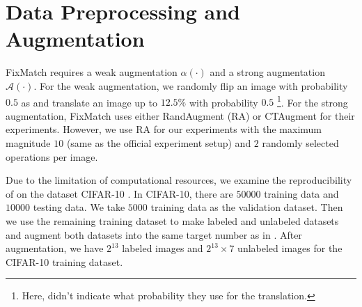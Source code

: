 \section{Data Preprocessing and Augmentation} \label{sec:data}
FixMatch requires a weak augmentation $\alpha(\cdot)$ and a strong augmentation $\mathcal{A}(\cdot)$.
For the weak augmentation, we randomly flip an image with probability $0.5$ as \citep{sohn2020fixmatch} and translate an image up to $12.5\%$ with probability $0.5$ \footnote{Here, \citep{sohn2020fixmatch} didn't indicate what probability they use for the translation.}. For the strong augmentation, FixMatch uses either RandAugment (RA) \citep{cubuk2020randaugment} or CTAugment \citep{kurakin2020remixmatch} for their experiments. However, we use RA for our experiments with the maximum magnitude $10$ (same as the official experiment setup) and $2$ randomly selected operations per image.

Due to the limitation of computational resources, we examine the reproducibility of \citep{sohn2020fixmatch} on the dataset CIFAR-10 \citep{krizhevsky2009learning}.
In CIFAR-10, there are $50000$ training data and $10000$ testing data. We take $5000$ training data as the validation dataset. Then we use the remaining training dataset to make labeled and unlabeled datasets and augment both datasets into the same target number as in \citep{sohn2020fixmatch}. After augmentation, we have $2^{13}$ labeled images and $2^{13} \times 7$ unlabeled images for the CIFAR-10 training dataset. 